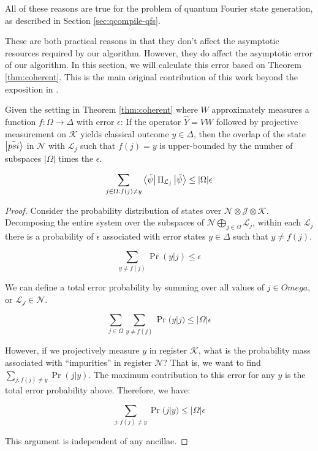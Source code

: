 All of these reasons are true for the problem of quantum Fourier state
generation, as described in Section \ref{sec:qcompile-qfs}.

These are both practical reasons in that they don't affect the
asymptotic resources required by our algorithm. However, they do affect
the asymptotic error of our algorithm. In this section, we will calculate
this error based on Theorem \ref{thm:coherent}. This is the main original
contribution of this work beyond the exposition in \cite{Kitaev2002}.

\begin{theorem}
Given the setting in Theorem \ref{thm:coherent}
where $W$ approximately measures a function $f : \Omega \rightarrow \Delta$
with error $\epsilon$: If the operator $\hat{Y} = VW$ followed by projective
measurement on $\mathcal{K}$ yields classical outcome $y \in \Delta$,
then the
overlap of the state $\left\vert{\tilde{psi}}\right\rangle$ in $\mathcal{N}$ with $\mathcal{L}_j$ such
that $f(j) = y$ is upper-bounded by the number of subspaces $|\Omega|$ times the
$\epsilon$.

\begin{equation}
\sum_{j \in \Omega: f(j) \ne y} \left\langle{\tilde{\psi}}\right\vert\Pi_{\mathcal{L}_j}\left\vert{\tilde{\psi}}\right\rangle \le |\Omega|\epsilon
\end{equation}
\label{thm:projective}
\end{theorem}

\begin{proof}
Consider the probability distribution of states over $\mathcal{N} \otimes \mathcal{J} \otimes \mathcal{K}$.
Decomposing the entire system over the subspaces of $\mathcal{N} \bigoplus_{j \in \Omega} \mathcal{L}_j$,
within each $\mathcal{L}_j$ there is a probability of $\epsilon$ associated with error states $y \in \Delta$
such that $y \ne f(j)$.

\begin{equation}
\sum_{y \ne f(j)} \Pr(y | j) \le \epsilon
\end{equation}

We can define a total error probability by summing over all values of $j \in Omega$, or
$\mathcal{L_j} \in \mathcal{N}$.

\begin{equation}
\sum_{j \in \Omega} \sum_{y \ne f(j)} \Pr(y | j) \le |\Omega|\epsilon
\end{equation}

However, if we projectively measure $y$ in register $\mathcal{K}$, what is the probability
mass associated with ``impurities'' in register $\mathcal{N}$? That is, we want to
find $\sum_{j: f(j) \ne y} \Pr(j | y)$. The maximum contribution to this error for
any $y$ is the total error probability above. Therefore, we have:

\begin{equation}
\sum_{j: f(j) \ne y} \Pr(j | y) \le |\Omega|\epsilon
\end{equation}

This argument is independent of any ancillae.
\end{proof}